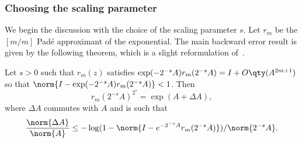 \subsubsection{Choosing the scaling parameter}
We begin the discussion with the choice of the scaling parameter $s$. Let $r_m$ be the $[m/m]$ Padé approximant of the exponential. The main backward error result is given by the following theorem, which is a slight reformulation of~\cite[Thm.~2.1]{higham:SaS_revisited}.
\begin{teorema}\label{teor:sas_backerr}
	Let $s>0$ such that	$r_m(z)$ satisfies $\exp(-2^{-s}A)r_m(2^{-s}A)=I+O\qty(A^{2m+1})$ so that $\norm{I-\exp(-2^{-s}A)r_m(2^{-s}A)}<1$. Then
	\[
		r_m(2^{-s}A)^{2^s}=\exp(A+\Delta{A}),
	\]
	where $\Delta{A}$ commutes with $A$ and is such that 
	\begin{equation}\label{eqn:backerr_bound_log}
		\frac{\norm{\Delta{A}}}{\norm{A}}\le{-\log(1-\norm{I-e^{-2^{-s}A}r_m(2^{-s}A)})}/{\norm{2^{-s}A}}.
	\end{equation}
\end{teorema}
